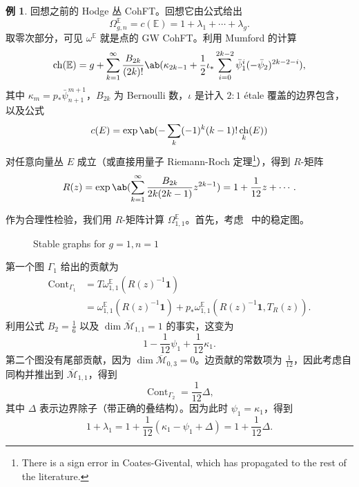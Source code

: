 \documentclass{amsart}
\theoremstyle{definition}
\newtheorem{exm}[thm]{例}
\theoremstyle{remark}
\theoremstyle{plain}
\theoremstyle{definition}
\theoremstyle{remark}
\newcommand{\E}{\mathbb{E}}
\newcommand{\Mbar}{\overline{\mathcal{M}}}
\newcommand{\1}{\mathbf{1}}
\newcommand{\2}{\mathbf{2}}
\newcommand{\3}{\mathbf{3}}
\DeclareMathOperator{\ch}{ch}
\DeclareMathOperator{\Cont}{Cont}
\begin{document}
\begin{exm}
    回想之前的 Hodge 丛 CohFT。回想它由公式给出
    \[ \Omega^{\E}_{g,n} = c(\E) = 1 + \lambda_1 + \cdots + \lambda_g. \]
    取零次部分，可见 \(\omega^{\E}\) 就是点的 GW CohFT。利用 Mumford 的计算
    \[ \ch(\E) = g + \sum_{k=1}^{\infty} \frac{B_{2k}}{(2k)!}\ab(\kappa_{2k-1} + \frac{1}{2}\iota_*\sum_{i=0}^{2k-2} \bar{\psi}_1^{i} (-\bar{\psi}_2)^{2k-2-i}), \]
    其中 \(\kappa_{m} = p_* \bar{\psi}_{n+1}^{m+1}\)，\(B_{2k}\) 为 Bernoulli 数，\(\iota\) 是计入 \(2:1\) \'etale 覆盖的边界包含，以及公式
    \[ c(E) = \exp \ab(-\sum_k (-1)^k (k-1)!\ch_k(E)) \]
    对任意向量丛 \(E\) 成立（或直接用量子 Riemann-Roch 定理\footnote{There is a sign error in Coates-Givental, which has propagated to the rest of the literature.}），得到 \(R\)-矩阵
    \[ R(z) = \exp\ab( \sum_{k=1}^{\infty} \frac{B_{2k}}{2k(2k-1)} z^{2k-1}) = 1+\frac{1}{12}z + \cdots. \]

    作为合理性检验，我们用 \(R\)-矩阵计算 \(\Omega_{1,1}^{\E}\)。首先，考虑~ 中的稳定图。
    \begin{figure}[htpb]
    \begin{center}
    \end{center}
    \caption{Stable graphs for $g=1, n=1$}%
    \label{fig:03graphloop}
    \end{figure}
    第一个图 \(\Gamma_1\) 给出的贡献为
    \begin{align*}
        \Cont_{\Gamma_1} &= T\omega_{1,1}^{\E}(R(z)^{-1}\1) \\
        &= \omega_{1,1}^{\E}(R(z)^{-1}\1) + p_* \omega_{1,1}^{\E}(R(z)^{-1}\1, T_R(z)).
    \end{align*}
    利用公式 \(B_2 = \frac{1}{6}\) 以及 \(\dim \Mbar_{1,1} = 1\) 的事实，这变为
    \[ 1 - \frac{1}{12}\psi_1 + \frac{1}{12} \kappa_1. \]
    第二个图没有尾部贡献，因为 \(\dim \Mbar_{0,3} = 0\)。边贡献的常数项为 \(\frac{1}{12}\)，因此考虑自同构并推出到 \(\Mbar_{1,1}\)，得到
    \[ \Cont_{\Gamma_2} = \frac{1}{12} \Delta, \]
    其中 \(\Delta\) 表示边界除子（带正确的叠结构）。因为此时 \(\psi_1 = \kappa_1\)，得到
    \[ 1+\lambda_1 = 1 + \frac{1}{12}(\kappa_1 - \psi_1 + \Delta) = 1 + \frac{1}{12} \Delta. \]
\end{exm}
\end{document}

